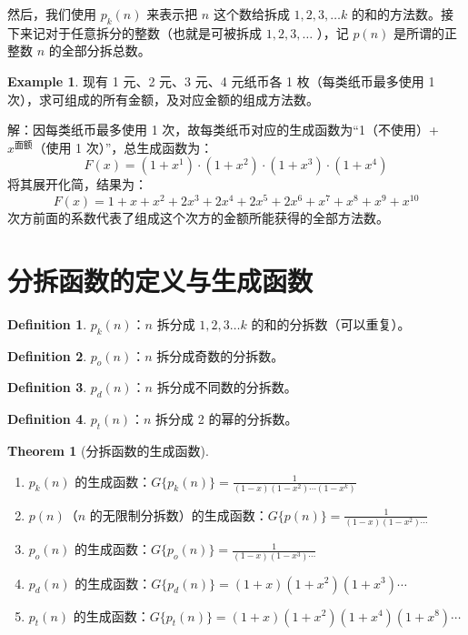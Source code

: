 \documentclass[oneside]{book}
\theoremstyle{definition}
\newtheorem{example}{Example}[section]
\newtheorem{definition}{Definition}[section]
\newtheorem{theorem}{Theorem}[section]
\begin{document}
然后，我们使用 \(p_k(n)\) 来表示把 \(n\) 这个数给拆成 \({1,2,3,\dots k}\) 的和的方法数。接下来记对于任意拆分的整数（也就是可被拆成 \({1,2,3,\dots }\) ），记 \(p(n)\)
是所谓的正整数 \(n\) 的全部分拆总数。


\begin{example}
	现有 1 元、2 元、3 元、4 元纸币各 1 枚（每类纸币最多使用 1 次），求可组成的所有金额，及对应金额的组成方法数。
	
	解：因每类纸币最多使用 1 次，故每类纸币对应的生成函数为“1（不使用）+ \( x^{\text{面额}} \)（使用 1 次）”，总生成函数为：
	\[
	F(x) = (1 + x^1) \cdot (1 + x^2) \cdot (1 + x^3) \cdot (1 + x^4)
	\]
	将其展开化简，结果为：
	\[
	F(x) = 1 + x + x^2 + 2x^3 + 2x^4 + 2x^5 + 2x^6 + x^7 + x^8 + x^9 + x^{10}
	\]
次方前面的系数代表了组成这个次方的金额所能获得的全部方法数。
\end{example}

\section{分拆函数的定义与生成函数}

\begin{definition}
	\( p_k(n) \)：\( n \) 拆分成 \(1,2,3\dots k\) 的和的分拆数（可以重复）。
\end{definition}

\begin{definition}
	\( p_o(n) \)：\( n \) 拆分成奇数的分拆数。
\end{definition}

\begin{definition}
	\( p_d(n) \)：\( n \) 拆分成不同数的分拆数。
\end{definition}

\begin{definition}
	\( p_t(n) \)：\( n \) 拆分成 2 的幂的分拆数。
\end{definition}

\begin{theorem}[分拆函数的生成函数]
	
	\begin{enumerate}
		\item \( p_k(n) \) 的生成函数：\( G\{p_k(n)\} = \frac{1}{(1-x)(1-x^2)\cdots(1-x^k)} \)
		\item \( p(n) \)（\( n \) 的无限制分拆数）的生成函数：\( G\{p(n)\} = \frac{1}{(1-x)(1-x^2)\cdots} \)
		\item \( p_o(n) \) 的生成函数：\( G\{p_o(n)\} = \frac{1}{(1-x)(1-x^3)\cdots} \)
		\item \( p_d(n) \) 的生成函数：\( G\{p_d(n)\} = (1+x)(1+x^2)(1+x^3)\cdots \)
		\item \( p_t(n) \) 的生成函数：\( G\{p_t(n)\} = (1+x)(1+x^2)(1+x^4)(1+x^8)\cdots \)
	\end{enumerate}
\end{theorem}
\end{document}

